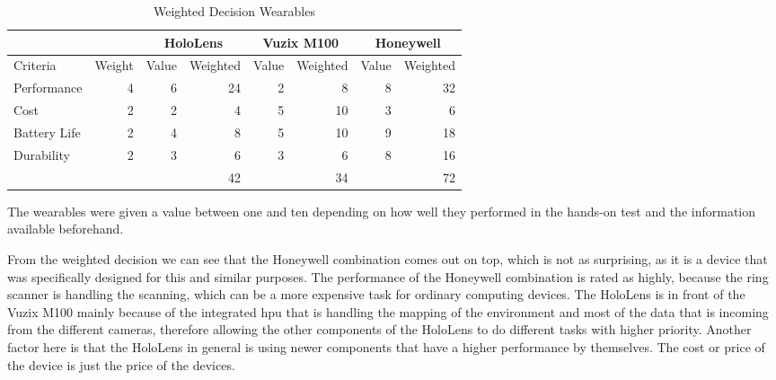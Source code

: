 \begin{table}[htbp]
\centering
\begin{tabular}{|lr|rr|rr|rr|} \hline
             &                            & \multicolumn{2}{c|}{HoloLens}                             & \multicolumn{2}{c|}{Vuzix M100}                           & \multicolumn{2}{c|}{Honeywell}                            \\ \hline
Criteria     & \multicolumn{1}{l|}{Weight} & \multicolumn{1}{l}{Value} & \multicolumn{1}{l|}{Weighted} & \multicolumn{1}{l}{Value} & \multicolumn{1}{l|}{Weighted} & \multicolumn{1}{l}{Value} & \multicolumn{1}{l|}{Weighted} \\
Performance  & 4                          & 6                         & 24                           & 2                         & 8                            & 8                         & 32                           \\
Cost         & 2                          & 2                         & 4                            & 5                         & 10                           & 3                         & 6                            \\
Battery Life & 2                          & 4                         & 8                            & 5                         & 10                           & 9                         & 18                           \\
Durability   & 2                          & 3                         & 6                            & 3                         & 6                            & 8                         & 16                           \\ \hline
             &                            &                           & 42                           &                           & 34                           &                           & 72                           \\ \hline
\end{tabular}
\caption{Weighted Decision Wearables}
\label{tab:weightedDecision}
\end{table}

The wearables were given a value between one and ten depending on how well they performed in the hands-on test and the information available beforehand.

From the weighted decision we can see that the Honeywell combination comes out on top, which is not as surprising, as it is a device that was specifically designed for this and similar purposes. The performance of the Honeywell combination is rated as highly, because the ring scanner is handling the scanning, which can be a more expensive task for ordinary computing devices. The HoloLens is in front of the Vuzix M100 mainly because of the integrated \gls{hpu} that is handling the mapping of the environment and most of the data that is incoming from the different cameras, therefore allowing the other components of the HoloLens to do different tasks with higher priority. Another factor here is that the HoloLens in general is using newer components that have a higher performance by themselves. The cost or price of the device is just the price of the devices. 

